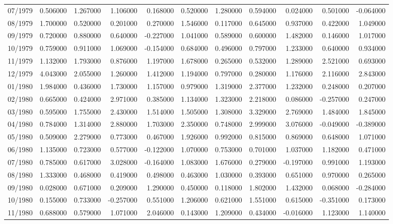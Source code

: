 \begin{tabular}{lrrrrrrrrrr}
07/1979 & 0.506000 & 1.267000 & 1.106000 & 0.168000 & 0.520000 & 1.280000 & 0.594000 & 0.024000 & 0.501000 & -0.064000 \\
08/1979 & 1.700000 & 0.520000 & 0.201000 & 0.270000 & 1.546000 & 0.117000 & 0.645000 & 0.937000 & 0.422000 & 1.049000 \\
09/1979 & 0.720000 & 0.880000 & 0.640000 & -0.227000 & 1.041000 & 0.589000 & 0.600000 & 1.482000 & 0.146000 & 1.017000 \\
10/1979 & 0.759000 & 0.911000 & 1.069000 & -0.154000 & 0.684000 & 0.496000 & 0.797000 & 1.233000 & 0.640000 & 0.934000 \\
11/1979 & 1.132000 & 1.793000 & 0.876000 & 1.197000 & 1.678000 & 0.265000 & 0.532000 & 1.289000 & 2.521000 & 0.693000 \\
12/1979 & 4.043000 & 2.055000 & 1.260000 & 1.412000 & 1.194000 & 0.797000 & 0.280000 & 1.176000 & 2.116000 & 2.843000 \\
01/1980 & 1.984000 & 0.436000 & 1.730000 & 1.157000 & 0.979000 & 1.319000 & 2.377000 & 1.232000 & 0.248000 & 0.207000 \\
02/1980 & 0.665000 & 0.424000 & 2.971000 & 0.385000 & 1.134000 & 1.323000 & 2.218000 & 0.086000 & -0.257000 & 0.247000 \\
03/1980 & 0.595000 & 1.755000 & 2.430000 & 1.514000 & 1.505000 & 1.308000 & 3.329000 & 2.769000 & 1.484000 & 1.845000 \\
04/1980 & 0.784000 & 1.314000 & 2.880000 & 1.703000 & 2.350000 & 0.748000 & 2.999000 & 3.076000 & -0.049000 & -0.389000 \\
05/1980 & 0.509000 & 2.279000 & 0.773000 & 0.467000 & 1.926000 & 0.992000 & 0.815000 & 0.869000 & 0.648000 & 1.071000 \\
06/1980 & 1.135000 & 0.723000 & 0.577000 & -0.122000 & 1.070000 & 0.753000 & 0.701000 & 1.037000 & 1.182000 & 0.471000 \\
07/1980 & 0.785000 & 0.617000 & 3.028000 & -0.164000 & 1.083000 & 1.676000 & 0.279000 & -0.197000 & 0.991000 & 1.193000 \\
08/1980 & 1.333000 & 0.468000 & 0.419000 & 0.498000 & 0.463000 & 1.030000 & 0.393000 & 0.651000 & 0.970000 & 0.265000 \\
09/1980 & 0.028000 & 0.671000 & 0.209000 & 1.290000 & 0.450000 & 0.118000 & 1.802000 & 1.432000 & 0.068000 & -0.284000 \\
10/1980 & 0.155000 & 0.733000 & -0.257000 & 0.551000 & 1.206000 & 0.621000 & 1.551000 & 0.615000 & -0.351000 & 0.173000 \\
11/1980 & 0.688000 & 0.579000 & 1.071000 & 2.046000 & 0.143000 & 1.209000 & 0.434000 & -0.016000 & 1.123000 & 1.140000 \\

\end{tabular}
